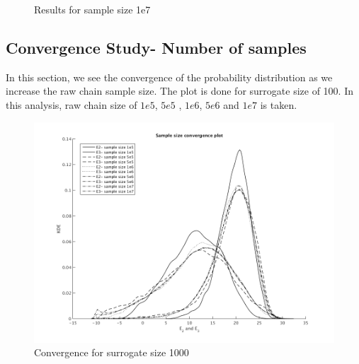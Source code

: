 \begin{figure}[H]
\centering
{}  
    \caption{Results for sample size 1e7}
\end{figure}

\subsection{Convergence Study- Number of samples }

\noindent In this section, we see the convergence of the probability distribution as we increase the raw chain sample size. The plot is done for surrogate size of 100. In this analysis, raw chain size of $1e5$, $5e5$ , $1e6$, $5e6$ and $1e7$ is taken. 

\begin{figure}[H]
\centering
\includegraphics[scale = 0.7]{model_2/sample_conv} 
    \caption{Convergence for surrogate size 1000}
\end{figure}


